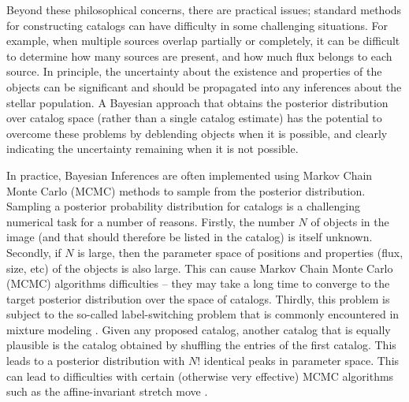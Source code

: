 \documentclass[12pt, preprint]{aastex}
\begin{document}
Beyond these philosophical concerns, there are practical issues;
standard methods for constructing catalogs can have difficulty in some
challenging situations. For example, when multiple sources overlap partially
or completely, it can be difficult to determine how many sources are present,
and how much flux belongs to each source. In principle, the uncertainty about
the existence and properties of the objects can be significant and should be
propagated into any inferences about the stellar population. A Bayesian approach
that obtains the posterior distribution over catalog space (rather than a single
catalog estimate) has the potential to overcome these problems by deblending
objects when it is possible, and clearly indicating the uncertainty remaining
when it is not possible.

In practice, Bayesian Inferences are often implemented using Markov Chain Monte
Carlo (MCMC) methods \citep{mackay} to sample from the posterior distribution.
Sampling a posterior probability distribution for catalogs is a challenging
numerical task for a number of reasons. Firstly, the number $N$ of objects in the
image (and that should therefore be listed in the catalog) is itself unknown.
Secondly, if $N$ is large, then the parameter space
of positions and properties (flux, size, etc) of the objects is also large.
This can cause Markov Chain Monte Carlo (MCMC) algorithms difficulties -- they
may take a long time to converge to the target posterior distribution over
the space of catalogs. Thirdly, this problem is subject to the so-called
label-switching problem that is commonly encountered in mixture modeling
\citep[e.g.][]{label_switching}. Given any proposed catalog, another catalog that is
equally plausible is the catalog obtained by shuffling the entries of the first
catalog. This leads to a posterior distribution with $N!$ identical peaks in
parameter space. This can lead to difficulties with certain (otherwise very
effective) MCMC algorithms such as the affine-invariant stretch move
\citep{goodman, emcee}.
\end{document}
